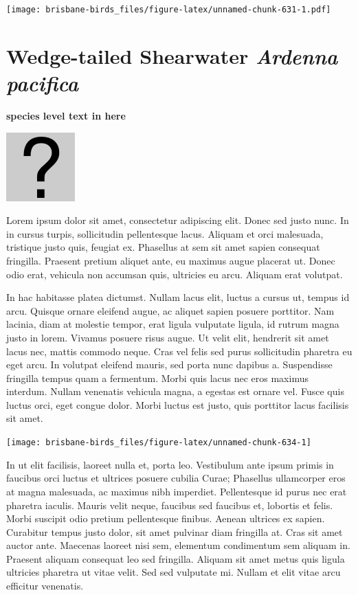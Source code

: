 \documentclass[]{book}
\let\origfigure\figure
\let\endorigfigure\endfigure
\renewenvironment{figure}[1][2] {
  \expandafter\origfigure\expandafter[H]
} {
  \endorigfigure
}
\begin{document}
\texttt{[image: brisbane-birds\_files/figure-latex/unnamed-chunk-631-1.pdf]}

\section{\texorpdfstring{Wedge-tailed Shearwater \emph{Ardenna
pacifica}}{Wedge-tailed Shearwater Ardenna pacifica}}\label{wedge-tailed-shearwater-ardenna-pacifica}

\textbf{species level text in here}

\begin{figure}
\centering
\includegraphics{assets/missing.png}
\caption{No image for species}
\end{figure}

Lorem ipsum dolor sit amet, consectetur adipiscing elit. Donec sed justo
nunc. In in cursus turpis, sollicitudin pellentesque lacus. Aliquam et
orci malesuada, tristique justo quis, feugiat ex. Phasellus at sem sit
amet sapien consequat fringilla. Praesent pretium aliquet ante, eu
maximus augue placerat ut. Donec odio erat, vehicula non accumsan quis,
ultricies eu arcu. Aliquam erat volutpat.

In hac habitasse platea dictumst. Nullam lacus elit, luctus a cursus ut,
tempus id arcu. Quisque ornare eleifend augue, ac aliquet sapien posuere
porttitor. Nam lacinia, diam at molestie tempor, erat ligula vulputate
ligula, id rutrum magna justo in lorem. Vivamus posuere risus augue. Ut
velit elit, hendrerit sit amet lacus nec, mattis commodo neque. Cras vel
felis sed purus sollicitudin pharetra eu eget arcu. In volutpat eleifend
mauris, sed porta nunc dapibus a. Suspendisse fringilla tempus quam a
fermentum. Morbi quis lacus nec eros maximus interdum. Nullam venenatis
vehicula magna, a egestas est ornare vel. Fusce quis luctus orci, eget
congue dolor. Morbi luctus est justo, quis porttitor lacus facilisis sit
amet.

\begin{figure}
\texttt{[image: brisbane-birds\_files/figure-latex/unnamed-chunk-634-1]} \caption{insert figure caption}\label{fig:unnamed-chunk-634}
\end{figure}

In ut elit facilisis, laoreet nulla et, porta leo. Vestibulum ante ipsum
primis in faucibus orci luctus et ultrices posuere cubilia Curae;
Phasellus ullamcorper eros at magna malesuada, ac maximus nibh
imperdiet. Pellentesque id purus nec erat pharetra iaculis. Mauris velit
neque, faucibus sed faucibus et, lobortis et felis. Morbi suscipit odio
pretium pellentesque finibus. Aenean ultrices ex sapien. Curabitur
tempus justo dolor, sit amet pulvinar diam fringilla at. Cras sit amet
auctor ante. Maecenas laoreet nisi sem, elementum condimentum sem
aliquam in. Praesent aliquam consequat leo sed fringilla. Aliquam sit
amet metus quis ligula ultricies pharetra ut vitae velit. Sed sed
vulputate mi. Nullam et elit vitae arcu efficitur venenatis.
\end{document}
